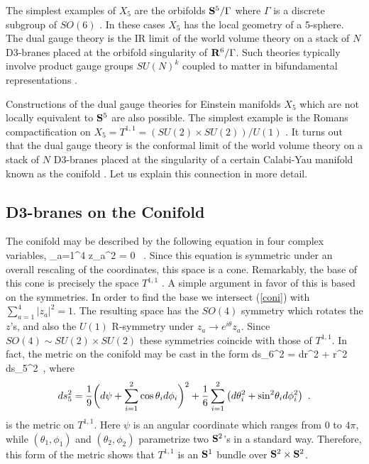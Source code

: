 \documentclass[12pt]{article}
\begin{document}
The simplest examples of $X_5$ are the orbifolds ${\bf S}^5/\Gamma$ where 
$\Gamma$ is a discrete subgroup of $SO(6)$ \cite{ks,lnv}. In these cases
$X_5$ has the local geometry of a 5-sphere.
The dual gauge theory is the IR
limit of the world volume theory on a stack of $N$ D3-branes placed at
the orbifold singularity of ${\bf R}^6/\Gamma$. Such theories
typically involve product gauge groups $SU(N)^k$ coupled to matter
in bifundamental representations \cite{dm}.

Constructions of the dual gauge theories for Einstein manifolds
$X_5$ which are not locally equivalent to ${\bf S}^5$ are also possible. 
The simplest
example is the Romans compactification on
$X_5= T^{1,1}= (SU(2)\times SU(2))/U(1)$ \cite{Romans,KW}. 
It turns out that
the dual gauge theory is the conformal limit of 
the world volume theory on a stack of $N$ D3-branes placed at
the singularity of a certain Calabi-Yau
manifold known as the conifold \cite{KW}. Let us explain this connection
in more detail. 

\subsection{D3-branes on the Conifold}

The conifold may be described by the
following equation in four complex variables,
\be \label{coni}
\sum_{a=1}^4 z_a^2 = 0
\ .
\ee
Since this equation is symmetric under an overall rescaling of the
coordinates, this space is a cone. Remarkably, the base of this cone
is precisely the space $T^{1,1}$ \cite{cd,KW}. A simple argument
in favor of this is based on the symmetries. In order to find the base
we intersect (\ref{coni}) with $\sum_{a=1}^4 |z_a|^2 = 1$.
The resulting space has the $SO(4)$ symmetry which rotates the $z$'s,
and also the $U(1)$ R-symmetry under $z_a\rightarrow e^{i\theta} z_a$.
Since $SO(4)\sim SU(2)\times SU(2)$ these symmetries coincide with those
of $T^{1,1}$. In fact, the metric on the conifold may be
cast in the form \cite{cd}
\be
ds_6^2 = dr^2 + r^2 ds_5^2\ ,
\ee
where 
\begin{equation} \label{co}
d s_5^2=
{1\over 9} \bigg(d\psi + 
\sum_{i=1}^2 \cos \theta_i d\phi_i\bigg)^2+
{1\over 6} \sum_{i=1}^2 \left(
d\theta_i^2 + {\rm sin}^2\theta_i d\phi_i^2
 \right)
\ .
\end{equation}
is the metric on $T^{1,1}$. Here $\psi$ is an angular coordinate
which  ranges from $0$ to $4\pi$,  while $(\theta_1,\phi_1)$
and $(\theta_2,\phi_2)$ parametrize two ${\bf S}^2$'s in a standard way.
Therefore, this form of the metric shows that
$T^{1,1}$ is an ${\bf S}^1$ bundle over ${\bf S}^2 \times {\bf S}^2$.
\end{document}
